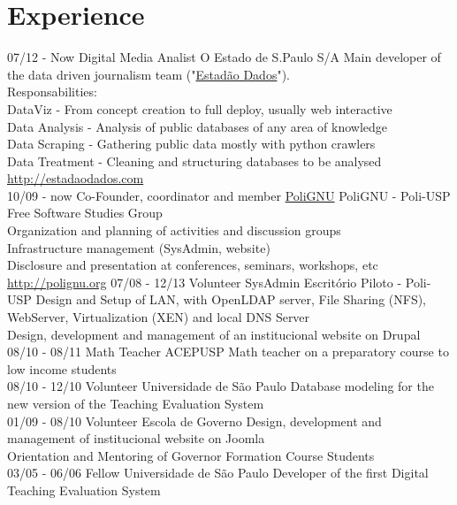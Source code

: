 \documentclass[]{friggeri-cv}
\begin{document}
\section{Experience}
\begin{entrylist}
  \entry
    {07/12 - Now}
    {Digital Media Analist}
    {O Estado de S.Paulo S/A}
    {Main developer of the data driven journalism team ("\href{http://estadaodados.com}{Estadão Dados}").\\
     Responsabilities:\\
     DataViz - From concept creation to full deploy, usually web interactive\\
     Data Analysis - Analysis of public databases of any area of knowledge\\
     Data Scraping - Gathering public data mostly with python crawlers\\
     Data Treatment - Cleaning and structuring databases to be analysed\\
     \href{http://estadaodados.com}{http://estadaodados.com}\\}
  \entry
    {10/09 - now}
    {Co-Founder, coordinator and member}
    {\href{http://polignu.org}{PoliGNU}}
    {PoliGNU - Poli-USP Free Software Studies Group\\
    Organization and planning of activities and discussion groups\\
     Infrastructure management (SysAdmin, website)\\
     Disclosure and presentation at conferences, seminars, workshops, etc\\
     \href{http://polignu.org}{http://polignu.org}}
   \entry
    {07/08 - 12/13}
    {Volunteer SysAdmin}
    {Escritório Piloto - Poli-USP}
    {Design and Setup of LAN, with OpenLDAP server, File Sharing (NFS), WebServer, Virtualization (XEN) and local DNS Server\\
     Design, development and management of an institucional website on Drupal\\}
   \entry
    {08/10 - 08/11}
    {Math Teacher}
    {ACEPUSP}
    {Math teacher on a preparatory course to low income students\\}
   \entry
    {08/10 - 12/10}
    {Volunteer}
    {Universidade de São Paulo}
    {Database modeling for the new version of the Teaching Evaluation System\\}
   \entry
    {01/09 - 08/10}
    {Volunteer}
    {Escola de Governo}
    {Design, development and management of institucional website on Joomla\\
     Orientation and Mentoring of Governor Formation Course Students\\}
   \entry
    {03/05 - 06/06}
    {Fellow}
    {Universidade de São Paulo}
    {Developer of the first Digital Teaching Evaluation System}
\end{entrylist}
\end{document}
